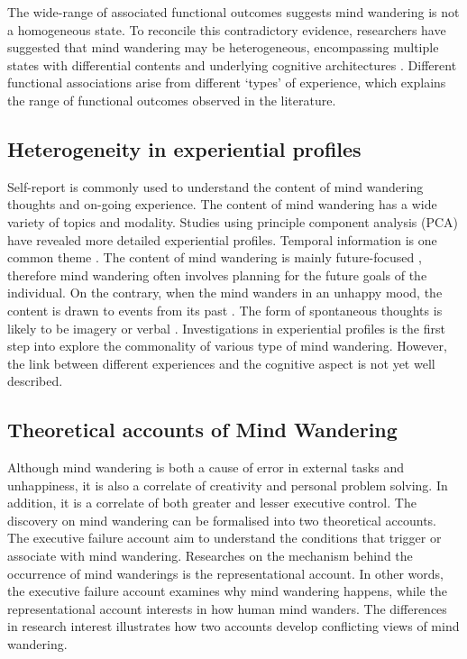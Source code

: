 The wide-range of associated functional outcomes suggests mind wandering is not a homogeneous state. To reconcile this contradictory evidence, researchers have suggested that mind wandering may be heterogeneous, encompassing multiple states with differential contents and underlying cognitive architectures \cite{SmallwoodFrontiers2013}. Different functional associations arise from different `types' of experience, which explains the range of functional outcomes observed in the literature.


\subsection{Heterogeneity in experiential profiles}
Self-report is commonly used to understand the content of mind wandering thoughts and on-going experience. The content of mind wandering has a wide variety of topics and modality. Studies using principle component analysis (PCA) have revealed more detailed experiential profiles. Temporal information is one common theme \cite{RubyFP2013,RubyPlos2013}. The content of mind wandering is mainly future-focused \cite{Baird2011}, therefore mind wandering often involves planning for the future goals of the individual. On the contrary, when the mind wanders in an unhappy mood, the content is drawn to events from its past \cite{Smallwood2011}. The form of spontaneous thoughts is likely to be imagery or verbal \cite{Gorgolewski2014,Smallwood2016}. Investigations in experiential profiles is the first step into explore the commonality of various type of mind wandering. However, the link between different experiences and the cognitive aspect is not yet well described.  



\subsection{Theoretical accounts of Mind Wandering}
Although mind wandering is both a cause of error in external tasks and unhappiness, it is also a correlate of creativity and personal problem solving. In addition, it is a correlate of both greater and lesser executive control. The discovery on mind wandering can be formalised into two theoretical accounts. The executive failure account aim to understand the conditions that trigger or associate with mind wandering. Researches on the mechanism behind the occurrence of mind wanderings is the representational account. In other words, the executive failure account examines why mind wandering happens, while the representational account interests in how human mind wanders. The differences in research interest illustrates how two accounts develop conflicting views of mind wandering. 

